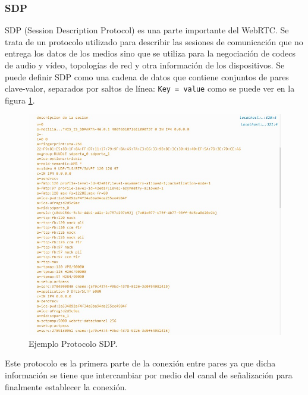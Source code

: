 \subsubsection*{SDP}
SDP (Session Description Protocol) es una parte importante del WebRTC. Se trata de un protocolo utilizado para describir las sesiones de comunicación que no entrega los datos de los medios sino que se utiliza para la negociación de codecs de audio y vídeo, topologías de red y otra información de los dispositivos. Se puede definir SDP como una cadena de datos que contiene conjuntos de pares clave-valor, separados por saltos de línea: \texttt{Key = value} como se puede ver en la figura \ref{fig:DescripcionSDP}.
\begin{figure}[!h]
\begin{center}
   \includegraphics[width=0.9\linewidth]{Figures/DescripcionSDP}
  \decoRule
  \caption[Ejemplo Protocolo SDP]{Ejemplo Protocolo SDP.}
\label{fig:DescripcionSDP}
\end{center}
\end{figure}

Este protocolo es la primera parte de la conexión entre pares ya que dicha información se tiene que intercambiar por medio del canal de señalización para finalmente establecer la conexión.
